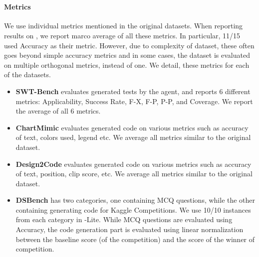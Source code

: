 \section{\bench{}}

\paragraph{Metrics}
\label{app:metrics}

We use individual metrics mentioned in the original datasets. When reporting results on \bench{}, we report marco average of all these metrics. In particular, 11/15 used Accuracy as their metric. However, due to complexity of dataset, these often goes beyond simple accuracy metrics and in some cases, the dataset is evaluated on multiple orthogonal metrics, instead of one. We detail, these metrics for each of the datasets.  

\begin{itemize}
    \item \textbf{SWT-Bench} evaluates generated tests by the agent, and reports 6 different metrics: Applicability, Success Rate, F-\>X, F-\>P, P-\>P, and Coverage. We report the average of all 6 metrics.
    \item \textbf{ChartMimic} evaluates generated code on various metrics such as accuracy of text, colors used, legend etc. We average all metrics similar to the original dataset.
    \item \textbf{Design2Code} evaluates generated code on various metrics such as accuracy of text, position, clip score, etc. We average all metrics similar to the original dataset. 
    \item \textbf{DSBench} has two categories, one containing MCQ questions, while the other containing generating code for Kaggle Competitions. We use 10/10 instances from each category in \bench{}-Lite. While MCQ questions are evaluated using Accuracy, the code generation part is evaluated using linear normalization between the baseline score (of the competition) and the score of the winner of competition.
\end{itemize}
